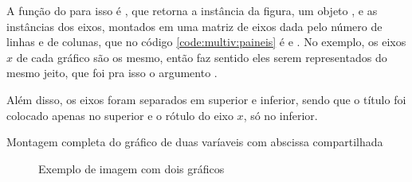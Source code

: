     A função do \pyplot para isso é , que retorna a instância da figura, um objeto , e as instâncias dos eixos, montados em uma matriz de eixos dada pelo número de linhas e de colunas, que no código \ref{code:multiv:paineis} é  e . No exemplo, os eixos $x$ de cada gráfico são os mesmo, então faz sentido eles serem representados do mesmo jeito, que foi pra isso o argumento .

    Além disso, os eixos foram separados em superior e inferior, sendo que o título foi colocado apenas no superior e o rótulo do eixo $x$, só no inferior.

    \begin{listing}[H]
        \caption{Montagem completa do gráfico de duas varíaveis com abscissa compartilhada}
        \label{code:multiv:paineis}

    \end{listing}

    \begin{figure}[H]
        \centering
        

        \caption{Exemplo de imagem com dois gráficos}
        \label{fig:multiv:paineis}
    \end{figure}
